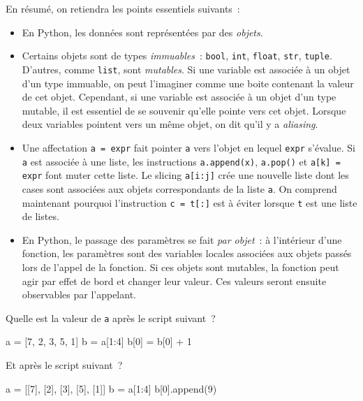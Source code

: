 \documentclass{magnolia}
\begin{document}
En résumé, on retiendra les points essentiels suivants~:
\begin{itemize}
\item En Python, les données sont représentées par des \emph{objets}.
\item Certains objets sont de types \emph{immuables}~: \verb_bool_, \verb_int_, \verb_float_, \verb_str_, \verb_tuple_.
  D'autres, comme \verb!list!, sont \emph{mutables}. Si une variable est associée à un objet d'un
  type immuable, on peut l'imaginer comme une boite contenant la valeur de cet objet.
  Cependant, si une variable est associée à un objet d'un type mutable, il est essentiel de se souvenir
  qu'elle pointe vers cet objet.
  Lorsque deux variables pointent vers un même objet, on dit qu'il y a \emph{aliasing}.
\item Une affectation \verb!a = expr! fait pointer \verb!a! vers l'objet en lequel \verb!expr! s'évalue.
  Si \verb!a! est associée à une liste, les instructions \verb!a.append(x)!, \verb!a.pop()! et
  \verb!a[k] = expr! font muter cette liste. Le slicing \verb!a[i:j]! crée une nouvelle liste
  dont les cases sont associées aux objets correspondants de la liste \verb!a!. On comprend maintenant pourquoi l'instruction \verb!c = t[:]! est
  à éviter lorsque \verb!t! est une liste de listes.
\item En Python, le passage des paramètres se fait \emph{par objet}~: à l'intérieur d'une fonction, les
  paramètres sont des variables locales associées aux objets passés lors de l'appel
  de la fonction. Si ces objets sont mutables, la fonction peut agir par effet de bord et changer
  leur valeur. Ces valeurs seront ensuite observables par l'appelant.
\end{itemize}

\vspace{2ex}
\begin{exoUnique}
\exo
\begin{questions}
\question Quelle est la valeur de \verb!a! après le script suivant~?
\begin{pythoncodeline}
a = [7, 2, 3, 5, 1]
b = a[1:4]
b[0] = b[0] + 1
\end{pythoncodeline}
\question Et après le script suivant~?
\begin{pythoncodeline}
a = [[7], [2], [3], [5], [1]]
b = a[1:4]
b[0].append(9)
\end{pythoncodeline}
\end{questions}
\end{exoUnique}
\end{document}
